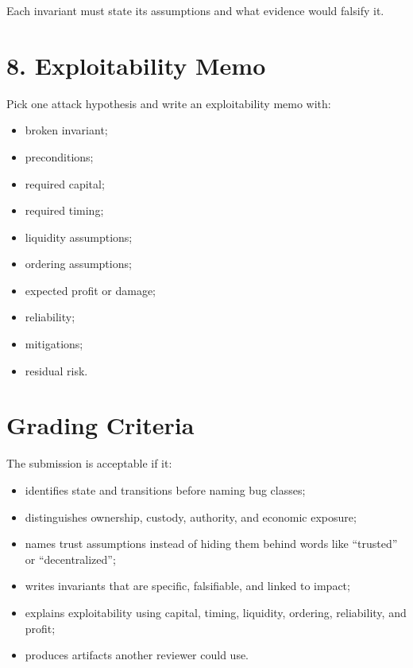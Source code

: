 Each invariant must state its assumptions and what evidence would falsify it.

\section*{8. Exploitability Memo}

Pick one attack hypothesis and write an exploitability memo with:

\begin{itemize}
\tightlist
\item
  broken invariant;
\item
  preconditions;
\item
  required capital;
\item
  required timing;
\item
  liquidity assumptions;
\item
  ordering assumptions;
\item
  expected profit or damage;
\item
  reliability;
\item
  mitigations;
\item
  residual risk.
\end{itemize}

\section*{Grading Criteria}

The submission is acceptable if it:

\begin{itemize}
\tightlist
\item
  identifies state and transitions before naming bug classes;
\item
  distinguishes ownership, custody, authority, and economic exposure;
\item
  names trust assumptions instead of hiding them behind words like ``trusted'' or ``decentralized'';
\item
  writes invariants that are specific, falsifiable, and linked to impact;
\item
  explains exploitability using capital, timing, liquidity, ordering, reliability, and profit;
\item
  produces artifacts another reviewer could use.
\end{itemize}
